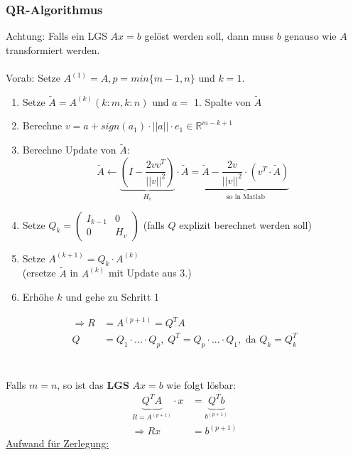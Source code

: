 \documentclass[4pt,a4paper]{scrartcl}
\begin{document}
\begin{multicols}{4}
\subsubsection{QR-Algorithmus}
Achtung: Falls ein LGS $Ax=b$ gelöst werden soll, dann muss $b$ genauso wie $A$ transformiert werden.\\\\
Vorab: Setze $A^{(1)}=A,p=min\{m-1,n\}$ und $k=1$.
\begin{enumerate}
\item Setze $\tilde{A}=A^{(k)}(k:m,k:n)$ und $a=$ 1. Spalte von $\tilde{A}$
\item Berechne $v=a+sign(a_1)\cdot ||a||\cdot e_1\in\mathbb{R}^{m-k+1}$
\item Berechne Update von $\tilde{A}$:
\begin{equation*}
\tilde{A}\leftarrow\underbrace{\left(I-\frac{2vv^T}{||v||^2}\right)}_{H_v}\cdot\tilde{A}=\underbrace{\tilde{A}-\frac{2v}{||v||^2}\cdot\left(v^T\cdot\tilde{A}\right)}_{\text{so in Matlab}}
\end{equation*}
\item Setze $Q_k=\begin{pmatrix}I_{k-1} & 0 \\ 0 & H_v\end{pmatrix}$ (falls $Q$ explizit berechnet werden soll)
\item Setze $A^{(k+1)}=Q_k\cdot A^{(k)}$\\
(ersetze $\tilde{A}$ in $A^{(k)}$ mit Update aus 3.)
\item Erhöhe $k$ und gehe zu Schritt 1
\end{enumerate}
\begin{equation*}
\begin{split}
\Rightarrow R&=A^{(p+1)}=Q^TA\\
Q&=Q_1\cdot ...\cdot Q_p,\;Q^T=Q_p\cdot ...\cdot Q_1,\text{ da }Q_k=Q_k^T
\end{split}
\end{equation*}\\\\
Falls $m=n$, so ist das \textbf{LGS} $Ax=b$ wie folgt lösbar:
\begin{equation*}
\begin{split}
\underbrace{Q^TA}_{R=A^{(p+1)}}\cdot x&=\underbrace{Q^Tb}_{b^{(p+1)}}\\
\Rightarrow Rx&=b^{(p+1)}
\end{split}
\end{equation*}
\underline{Aufwand für Zerlegung:}\\\\

\end{multicols}
\end{document}
